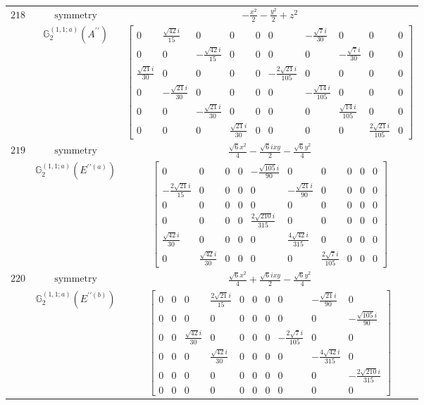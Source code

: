 \documentclass[fleqn,8pt,landscape]{jsarticle}
\begin{document}
\begin{longtable}{ccc}
$ 218 $ & $ \text{symmetry} $ & $ - \frac{x^{2}}{2} - \frac{y^{2}}{2} + z^{2} $ \\
$  $ & $ \mathbb{G}_{2}^{(1,1;a)}(A^{\prime\prime}) $ & $ \begin{bmatrix} 0 & \frac{\sqrt{42} i}{15} & 0 & 0 & 0 & 0 & - \frac{\sqrt{7} i}{30} & 0 & 0 & 0 \\ 0 & 0 & - \frac{\sqrt{42} i}{15} & 0 & 0 & 0 & 0 & - \frac{\sqrt{7} i}{30} & 0 & 0 \\ \frac{\sqrt{21} i}{30} & 0 & 0 & 0 & 0 & - \frac{2 \sqrt{21} i}{105} & 0 & 0 & 0 & 0 \\ 0 & - \frac{\sqrt{21} i}{30} & 0 & 0 & 0 & 0 & - \frac{\sqrt{14} i}{105} & 0 & 0 & 0 \\ 0 & 0 & - \frac{\sqrt{21} i}{30} & 0 & 0 & 0 & 0 & \frac{\sqrt{14} i}{105} & 0 & 0 \\ 0 & 0 & 0 & \frac{\sqrt{21} i}{30} & 0 & 0 & 0 & 0 & \frac{2 \sqrt{21} i}{105} & 0 \end{bmatrix} $ \\ \hline
$ 219 $ & $ \text{symmetry} $ & $ \frac{\sqrt{6} x^{2}}{4} - \frac{\sqrt{6} i x y}{2} - \frac{\sqrt{6} y^{2}}{4} $ \\
$  $ & $ \mathbb{G}_{2}^{(1,1;a)}(E^{\prime\prime(a)}) $ & $ \begin{bmatrix} 0 & 0 & 0 & 0 & - \frac{\sqrt{105} i}{90} & 0 & 0 & 0 & 0 & 0 \\ - \frac{2 \sqrt{21} i}{15} & 0 & 0 & 0 & 0 & - \frac{\sqrt{21} i}{90} & 0 & 0 & 0 & 0 \\ 0 & 0 & 0 & 0 & 0 & 0 & 0 & 0 & 0 & 0 \\ 0 & 0 & 0 & 0 & \frac{2 \sqrt{210} i}{315} & 0 & 0 & 0 & 0 & 0 \\ \frac{\sqrt{42} i}{30} & 0 & 0 & 0 & 0 & \frac{4 \sqrt{42} i}{315} & 0 & 0 & 0 & 0 \\ 0 & \frac{\sqrt{42} i}{30} & 0 & 0 & 0 & 0 & \frac{2 \sqrt{7} i}{105} & 0 & 0 & 0 \end{bmatrix} $ \\ \hline
$ 220 $ & $ \text{symmetry} $ & $ \frac{\sqrt{6} x^{2}}{4} + \frac{\sqrt{6} i x y}{2} - \frac{\sqrt{6} y^{2}}{4} $ \\
$  $ & $ \mathbb{G}_{2}^{(1,1;a)}(E^{\prime\prime(b)}) $ & $ \begin{bmatrix} 0 & 0 & 0 & \frac{2 \sqrt{21} i}{15} & 0 & 0 & 0 & 0 & - \frac{\sqrt{21} i}{90} & 0 \\ 0 & 0 & 0 & 0 & 0 & 0 & 0 & 0 & 0 & - \frac{\sqrt{105} i}{90} \\ 0 & 0 & \frac{\sqrt{42} i}{30} & 0 & 0 & 0 & 0 & - \frac{2 \sqrt{7} i}{105} & 0 & 0 \\ 0 & 0 & 0 & \frac{\sqrt{42} i}{30} & 0 & 0 & 0 & 0 & - \frac{4 \sqrt{42} i}{315} & 0 \\ 0 & 0 & 0 & 0 & 0 & 0 & 0 & 0 & 0 & - \frac{2 \sqrt{210} i}{315} \\ 0 & 0 & 0 & 0 & 0 & 0 & 0 & 0 & 0 & 0 \end{bmatrix} $ \\ \hline

\end{longtable}
\end{document}
